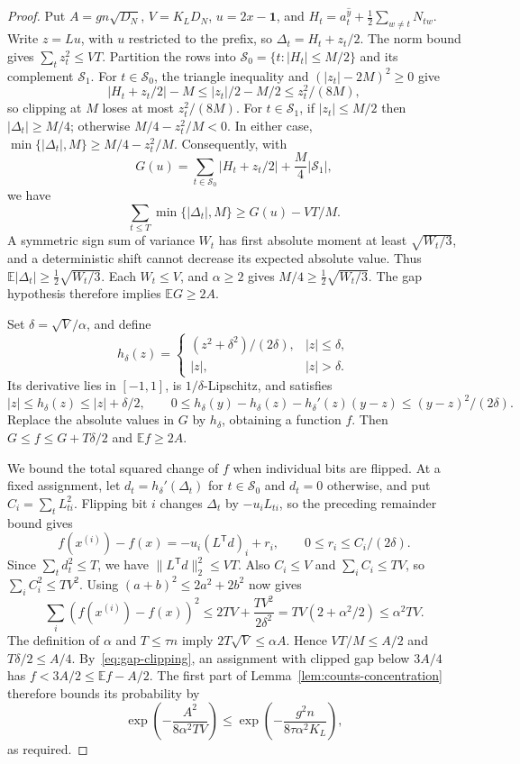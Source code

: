 \documentclass[11pt,a4paper]{article}
\theoremstyle{definition}
\theoremstyle{remark}
\newcommand{\E}{\mathbb E}
\newcommand{\ind}{\mathbf 1}
\begin{document}
\begin{proof}
Put $A=gn\sqrt{D_N}$, $V=K_LD_N$, $u=2x-\ind$, and
$H_t=a^{\hat y}_t+\frac12\sum_{w\ne t}N_{tw}$.
Write $z=Lu$, with $u$ restricted to the prefix, so
$\Delta_t=H_t+z_t/2$. The norm bound gives $\sum_tz_t^2\le VT$.
Partition the rows into $\mathcal S_0=\{t:|H_t|\le M/2\}$ and its complement $\mathcal S_1$.
For $t\in \mathcal S_0$, the triangle inequality and $(|z_t|-2M)^2\ge0$ give
\[
 |H_t+z_t/2|-M\le |z_t|/2-M/2\le z_t^2/(8M),
\]
so clipping at $M$ loses at most $z_t^2/(8M)$.
For $t\in \mathcal S_1$, if $|z_t|\le M/2$ then $|\Delta_t|\ge M/4$;
otherwise $M/4-z_t^2/M<0$. In either case,
$\min\{|\Delta_t|,M\}\ge M/4-z_t^2/M$.
Consequently, with
\[
 G(u)=\sum_{t\in \mathcal S_0}|H_t+z_t/2|+\frac M4|\mathcal S_1|,
\]
we have
\begin{equation}
 \sum_{t\le T}\min\{|\Delta_t|,M\}\ge G(u)-VT/M.
                                                        \label{eq:gap-clipping}
\end{equation}
A symmetric sign sum of variance $W_t$ has first absolute moment at least
$\sqrt{W_t/3}$, and a deterministic shift cannot decrease its expected
absolute value. Thus $\E|\Delta_t|\ge\frac12\sqrt{W_t/3}$.
Each $W_t\le V$, and $\alpha\ge2$ gives
$M/4\ge\frac12\sqrt{W_t/3}$. The gap hypothesis therefore implies
$\E G\ge2A$.

Set $\delta=\sqrt V/\alpha$, and define
\[
 h_\delta(z)=
 \begin{cases}(z^2+\delta^2)/(2\delta),&|z|\le\delta,\\
 |z|,&|z|>\delta.
 \end{cases}
\]
Its derivative lies in $[-1,1]$, is $1/\delta$-Lipschitz, and satisfies
\[
 |z|\le h_\delta(z)\le |z|+\delta/2,\qquad
 0\le h_\delta(y)-h_\delta(z)-h_\delta'(z)(y-z)
       \le (y-z)^2/(2\delta).
\]
Replace the absolute values in $G$ by $h_\delta$, obtaining a function $f$.
Then $G\le f\le G+T\delta/2$ and $\E f\ge2A$.

We bound the total squared change of $f$ when individual bits are flipped.
At a fixed assignment, let $d_t=h_\delta'(\Delta_t)$ for $t\in \mathcal S_0$
and $d_t=0$ otherwise, and put $C_i=\sum_tL_{ti}^2$.
Flipping bit $i$ changes $\Delta_t$ by $-u_iL_{ti}$, so the preceding
remainder bound gives
\[
 f(x^{(i)})-f(x)=-u_i(L^{\mathsf T}d)_i+r_i,
 \qquad 0\le r_i\le C_i/(2\delta).
\]
Since $\sum_td_t^2\le T$, we have
$\|L^{\mathsf T}d\|_2^2\le VT$.
Also $C_i\le V$ and $\sum_iC_i\le TV$, so
$\sum_iC_i^2\le TV^2$.
Using $(a+b)^2\le2a^2+2b^2$ now gives
\[
 \sum_i(f(x^{(i)})-f(x))^2
 \le2TV+\frac{TV^2}{2\delta^2}
 =TV(2+\alpha^2/2)\le\alpha^2TV.
\]
The definition of $\alpha$ and $T\le\tau n$ imply
$2T\sqrt V\le\alpha A$. Hence $VT/M\le A/2$ and
$T\delta/2\le A/4$.
By~\eqref{eq:gap-clipping}, an assignment with clipped gap below $3A/4$
has $f<3A/2\le\E f-A/2$.
The first part of Lemma~\ref{lem:counts-concentration} therefore bounds
its probability by
\[
 \exp\left(-\frac{A^2}{8\alpha^2TV}\right)
 \le\exp\left(-\frac{g^2n}{8\tau\alpha^2K_L}\right),
\]
as required.
\end{proof}
\end{document}
